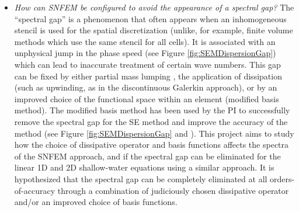 \documentclass[11pt]{article}
\begin{document}
\vspace{-0.4cm}
\begin{itemize}
\item \textit{How can SNFEM be configured to avoid the appearance of a spectral gap?}  The ``spectral gap'' is a phenomenon that often appears when an inhomogeneous stencil is used for the spatial discretization (unlike, for example, finite volume methods which use the same stencil for all cells).  It is associated with an unphysical jump in the phase speed (see Figure \ref{fig:SEMDispersionGap}) which can lead to inaccurate treatment of certain wave numbers.  This gap can be fixed by either partial mass lumping \cite{staniforth2013analysis}, the application of dissipation (such as upwinding, as in the discontinuous Galerkin approach), or by an improved choice of the functional space within an element (modified basis method).  The modified basis method has been used by the PI to successfully remove the spectral gap for the SE method and improve the accuracy of the method (see Figure \ref{fig:SEMDispersionGap} and \cite{ullrich2014understanding}).  This project aims to study how the choice of dissipative operator and basis functions affects the spectra of the SNFEM approach, and if the spectral gap can be eliminated for the linear 1D and 2D shallow-water equations using a similar approach.  It is hypothesized that the spectral gap can be completely eliminated at all orders-of-accuracy through a combination of judiciously chosen dissipative operator and/or an improved choice of basis functions.



\end{itemize}
\end{document}
